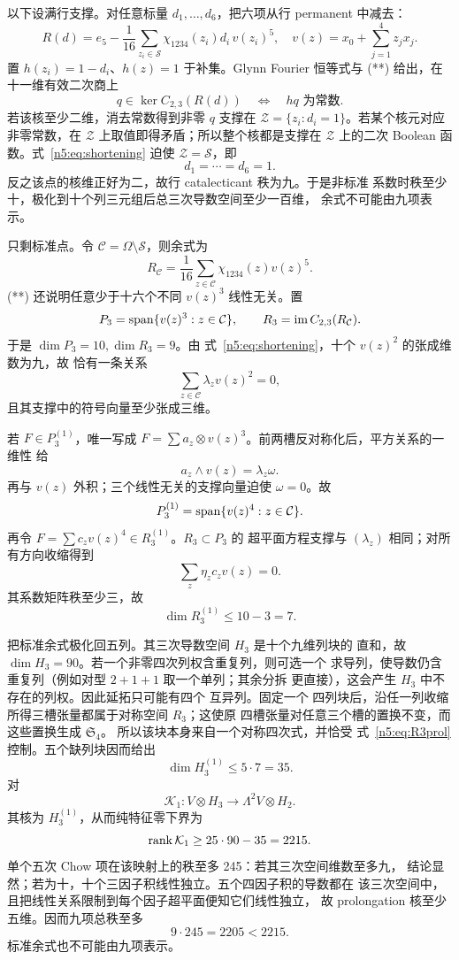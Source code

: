 以下设满行支撑。对任意标量 \(d_1,\ldots,d_6\)，把六项从行
permanent 中减去：
\[
 R(d)=e_5-\frac1{16}\sum_{z_i\in\mathcal S}
 \chi_{1234}(z_i)d_i\,v(z_i)^5,
\quad v(z)=x_0+\sum_{j=1}^4z_jx_j.
\]
置 \(h(z_i)=1-d_i\)、\(h(z)=1\) 于补集。Glynn Fourier 恒等式与
(**) 给出，在十一维有效二次商上
\[
q\in\ker C_{2,3}(R(d))
\quad\Longleftrightarrow\quad hq\text{ 为常数}.
\]
若该核至少二维，消去常数得到非零 \(q\) 支撑在
\(\mathcal Z=\{z_i:d_i=1\}\)。若某个核元对应非零常数，在
\(\mathcal Z\) 上取值即得矛盾；所以整个核都是支撑在
\(\mathcal Z\) 上的二次 Boolean 函数。式~\eqref{n5:eq:shortening}
迫使 \(\mathcal Z=\mathcal S\)，即
\begin{equation}\label{n5:eq:standardpoint}
d_1=\cdots=d_6=1.
\end{equation}
反之该点的核维正好为二，故行 catalecticant 秩为九。于是非标准
系数时秩至少十，极化到十个列三元组后总三次导数空间至少一百维，
余式不可能由九项表示。

只剩标准点。令 \(\mathcal C=\Omega\setminus\mathcal S\)，则余式为
\[
R_{\mathcal C}=\frac1{16}\sum_{z\in\mathcal C}
\chi_{1234}(z)v(z)^5 .
\]
(**) 还说明任意少于十六个不同 \(v(z)^3\) 线性无关。置
\[
P_3=\operatorname{span}\{v(z)^3:z\in\mathcal C\},\qquad
R_3=\operatorname{im} C_{2,3}(R_{\mathcal C}).
\]
于是 \(\dim P_3=10,\dim R_3=9\)。由
式~\eqref{n5:eq:shortening}，十个 \(v(z)^2\) 的张成维数为九，故
恰有一条关系
\[
\sum_{z\in\mathcal C}\lambda_zv(z)^2=0,
\]
且其支撑中的符号向量至少张成三维。

若 \(F\in P_3^{(1)}\)，唯一写成
\(F=\sum a_z\otimes v(z)^3\)。前两槽反对称化后，平方关系的一维性
给
\[
a_z\wedge v(z)=\lambda_z\omega.
\]
再与 \(v(z)\) 外积；三个线性无关的支撑向量迫使
\(\omega=0\)。故
\[
P_3^{(1)}=\operatorname{span}\{v(z)^4:z\in\mathcal C\}.
\]
再令 \(F=\sum c_zv(z)^4\in R_3^{(1)}\)。\(R_3\subset P_3\) 的
超平面方程支撑与 \((\lambda_z)\) 相同；对所有方向收缩得到
\[
\sum_z\eta_zc_zv(z)=0.
\]
其系数矩阵秩至少三，故
\begin{equation}\label{n5:eq:R3prol}
\dim R_3^{(1)}\le10-3=7.
\end{equation}

把标准余式极化回五列。其三次导数空间 \(H_3\) 是十个九维列块的
直和，故 \(\dim H_3=90\)。若一个非零四次列权含重复列，则可选一个
求导列，使导数仍含重复列（例如对型 \(2+1+1\) 取一个单列；其余分拆
更直接），这会产生 \(H_3\) 中不存在的列权。因此延拓只可能有四个
互异列。固定一个
四列块后，沿任一列收缩所得三槽张量都属于对称空间 \(R_3\)；这使原
四槽张量对任意三个槽的置换不变，而这些置换生成 \(\mathfrak S_4\)。
所以该块本身来自一个对称四次式，并恰受
式~\eqref{n5:eq:R3prol} 控制。五个缺列块因而给出
\[
\dim H_3^{(1)}\le5\cdot7=35.
\]
对
\[
 \mathcal K_1:V\otimes H_3\longrightarrow\Lambda^2V\otimes H_2.
\]
其核为 \(H_3^{(1)}\)，从而纯特征零下界为
\[
\operatorname{rank}\mathcal K_1\ge25\cdot90-35=2215.
\]
单个五次 Chow 项在该映射上的秩至多 245：若其三次空间维数至多九，
结论显然；若为十，十个三因子积线性独立。五个四因子积的导数都在
该三次空间中，且把线性关系限制到每个因子超平面便知它们线性独立，
故 prolongation 核至少五维。因而九项总秩至多
\[
9\cdot245=2205<2215.
\]
标准余式也不可能由九项表示。

